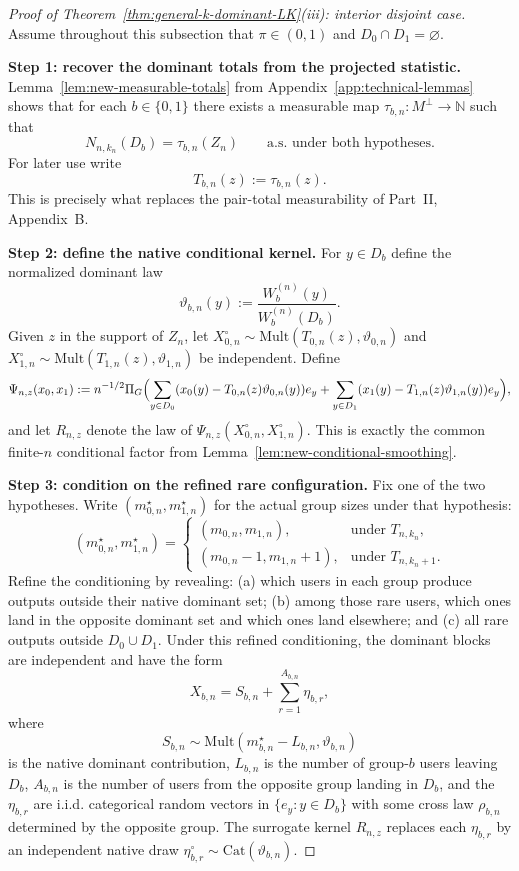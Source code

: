 \documentclass{article}
\newcommand{\Mult}{\mathrm{Mult}}
\newcommand{\Cat}{\mathrm{Cat}}
\newcommand{\N}{\mathbb N}
\newcommand{\1}{\mathbf 1}
\begin{document}
\begin{proof}[Proof of Theorem~\ref{thm:general-k-dominant-LK}(iii): interior disjoint case]
Assume throughout this subsection that $\pi\in(0,1)$ and $D_0\cap D_1=\varnothing$.

\textbf{Step 1: recover the dominant totals from the projected statistic.}
Lemma~\ref{lem:new-measurable-totals} from Appendix~\ref{app:technical-lemmas} shows that for each $b\in\{0,1\}$
there exists a measurable map $\tau_{b,n}:M^\perp\to\N$ such that
\[
N_{n,k_n}(D_b)=\tau_{b,n}(Z_n)\qquad\text{a.s. under both hypotheses.}
\]
For later use write
\[
T_{b,n}(z):=\tau_{b,n}(z).
\]
This is precisely what replaces the pair-total measurability of Part~II, Appendix~B.

\medskip
\textbf{Step 2: define the native conditional kernel.}
For $y\in D_b$ define the normalized dominant law
\[
\vartheta_{b,n}(y):=\frac{W_b^{(n)}(y)}{W_b^{(n)}(D_b)}.
\]
Given $z$ in the support of $Z_n$, let $X_{0,n}^\circ\sim \Mult(T_{0,n}(z),\vartheta_{0,n})$ and
$X_{1,n}^\circ\sim \Mult(T_{1,n}(z),\vartheta_{1,n})$ be independent. Define
\[
\Psi_{n,z}(x_0,x_1)
:=
 n^{-1/2}\Pi_G\Bigl(
 \sum_{y\in D_0}(x_0(y)-T_{0,n}(z)\vartheta_{0,n}(y))e_y
 +\sum_{y\in D_1}(x_1(y)-T_{1,n}(z)\vartheta_{1,n}(y))e_y
 \Bigr),
\]
and let $R_{n,z}$ denote the law of $\Psi_{n,z}(X_{0,n}^\circ,X_{1,n}^\circ)$. This is exactly the common
finite-$n$ conditional factor from Lemma~\ref{lem:new-conditional-smoothing}.

\medskip
\textbf{Step 3: condition on the refined rare configuration.}
Fix one of the two hypotheses. Write $(m_{0,n}^\star,m_{1,n}^\star)$ for the actual group sizes under that
hypothesis:
\[
(m_{0,n}^\star,m_{1,n}^\star)=
\begin{cases}
(m_{0,n},m_{1,n}), & \text{under }T_{n,k_n},\\
(m_{0,n}-1,m_{1,n}+1), & \text{under }T_{n,k_n+1}.
\end{cases}
\]
Refine the conditioning by revealing: (a) which users in each group produce outputs outside their native dominant
set; (b) among those rare users, which ones land in the opposite dominant set and which ones land elsewhere; and
(c) all rare outputs outside $D_0\cup D_1$. Under this refined conditioning, the dominant blocks are independent and
have the form
\[
X_{b,n}=S_{b,n}+\sum_{r=1}^{A_{b,n}}\eta_{b,r},
\]
where
\[
S_{b,n}\sim \Mult(m_{b,n}^\star-L_{b,n},\vartheta_{b,n})
\]
is the native dominant contribution, $L_{b,n}$ is the number of group-$b$ users leaving $D_b$, $A_{b,n}$ is the
number of users from the opposite group landing in $D_b$, and the $\eta_{b,r}$ are i.i.d. categorical random vectors
in $\{e_y:y\in D_b\}$ with some cross law $\rho_{b,n}$ determined by the opposite group. The surrogate kernel
$R_{n,z}$ replaces each $\eta_{b,r}$ by an independent native draw $\eta_{b,r}^\circ\sim \Cat(\vartheta_{b,n})$.


\end{proof}
\end{document}
